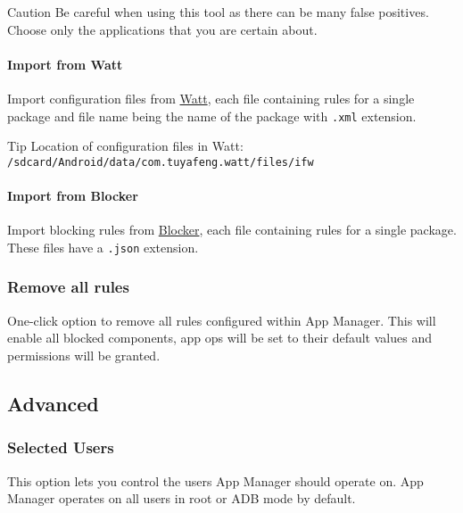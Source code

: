\begin{danger}{Caution}
    Be careful when using this tool as there can be many false positives.
    Choose only the applications that you are certain about.
\end{danger}

\paragraph{Import from Watt} Import configuration files from \href{https://github.com/tuyafeng/Watt}{Watt}, each file
containing rules for a single package and file name being the name of the package with \texttt{.xml} extension.

\begin{tip}{Tip}
    Location of configuration files in Watt: \texttt{/sdcard/Android/data/com.tuyafeng.watt/files/ifw}
\end{tip}

\paragraph{Import from Blocker} Import blocking rules from \href{https://github.com/lihenggui/blocker}{Blocker}, each file containing rules for a single package.
These files have a \texttt{.json} extension.

\subsubsection{Remove all rules} %
One-click option to remove all rules configured within App Manager.
This will enable all blocked components, app ops will be set to their default values and permissions will be granted.


\subsection{Advanced}\label{subsec:advanced} %

\subsubsection{Selected Users}\label{subsubsec:selected-users} %
This option lets you control the users App Manager should operate on. App Manager operates on all users in root or ADB mode by default.

